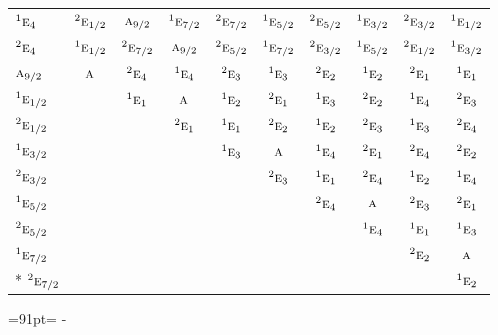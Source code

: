 \documentclass[10pt,a4paper]{article}
\newcommand{\needspace}[1]{\par\penalty-100\begingroup\dimen0=#1\relax\dimen2=\pagegoal
  \advance\dimen2-\pagetotal\ifdim\dimen0>\dimen2\relax\ifdim\dimen2>0pt\vfil\break\fi\fi
  \endgroup}
\numberwithin{equation}{section}
\newcommand{\irr}[1]{\text{\normalfont\scshape #1}}
\newcommand{\conjpair}[1]{{}^{#1}}
\begin{document}
{\begin{longtable}{@{}lccccccccc@{}}
$\conjpair{1}\irr{e}_{4}$ & $\conjpair{2}\irr{e}_{1/2}$ & $\irr{a}_{9/2}$ & $\conjpair{1}\irr{e}_{7/2}$ & $\conjpair{2}\irr{e}_{7/2}$ & $\conjpair{1}\irr{e}_{5/2}$ & $\conjpair{2}\irr{e}_{5/2}$ & $\conjpair{1}\irr{e}_{3/2}$ & $\conjpair{2}\irr{e}_{3/2}$ & $\conjpair{1}\irr{e}_{1/2}$\\
$\conjpair{2}\irr{e}_{4}$ & $\conjpair{1}\irr{e}_{1/2}$ & $\conjpair{2}\irr{e}_{7/2}$ & $\irr{a}_{9/2}$ & $\conjpair{2}\irr{e}_{5/2}$ & $\conjpair{1}\irr{e}_{7/2}$ & $\conjpair{2}\irr{e}_{3/2}$ & $\conjpair{1}\irr{e}_{5/2}$ & $\conjpair{2}\irr{e}_{1/2}$ & $\conjpair{1}\irr{e}_{3/2}$\\
$\irr{a}_{9/2}$ & $\irr{a}$ & $\conjpair{2}\irr{e}_{4}$ & $\conjpair{1}\irr{e}_{4}$ & $\conjpair{2}\irr{e}_{3}$ & $\conjpair{1}\irr{e}_{3}$ & $\conjpair{2}\irr{e}_{2}$ & $\conjpair{1}\irr{e}_{2}$ & $\conjpair{2}\irr{e}_{1}$ & $\conjpair{1}\irr{e}_{1}$\\
$\conjpair{1}\irr{e}_{1/2}$ &  & $\conjpair{1}\irr{e}_{1}$ & $\irr{a}$ & $\conjpair{1}\irr{e}_{2}$ & $\conjpair{2}\irr{e}_{1}$ & $\conjpair{1}\irr{e}_{3}$ & $\conjpair{2}\irr{e}_{2}$ & $\conjpair{1}\irr{e}_{4}$ & $\conjpair{2}\irr{e}_{3}$\\
$\conjpair{2}\irr{e}_{1/2}$ &  &  & $\conjpair{2}\irr{e}_{1}$ & $\conjpair{1}\irr{e}_{1}$ & $\conjpair{2}\irr{e}_{2}$ & $\conjpair{1}\irr{e}_{2}$ & $\conjpair{2}\irr{e}_{3}$ & $\conjpair{1}\irr{e}_{3}$ & $\conjpair{2}\irr{e}_{4}$\\
$\conjpair{1}\irr{e}_{3/2}$ &  &  &  & $\conjpair{1}\irr{e}_{3}$ & $\irr{a}$ & $\conjpair{1}\irr{e}_{4}$ & $\conjpair{2}\irr{e}_{1}$ & $\conjpair{2}\irr{e}_{4}$ & $\conjpair{2}\irr{e}_{2}$\\
$\conjpair{2}\irr{e}_{3/2}$ &  &  &  &  & $\conjpair{2}\irr{e}_{3}$ & $\conjpair{1}\irr{e}_{1}$ & $\conjpair{2}\irr{e}_{4}$ & $\conjpair{1}\irr{e}_{2}$ & $\conjpair{1}\irr{e}_{4}$\\
$\conjpair{1}\irr{e}_{5/2}$ &  &  &  &  &  & $\conjpair{2}\irr{e}_{4}$ & $\irr{a}$ & $\conjpair{2}\irr{e}_{3}$ & $\conjpair{2}\irr{e}_{1}$\\
$\conjpair{2}\irr{e}_{5/2}$ &  &  &  &  &  &  & $\conjpair{1}\irr{e}_{4}$ & $\conjpair{1}\irr{e}_{1}$ & $\conjpair{1}\irr{e}_{3}$\\
$\conjpair{1}\irr{e}_{7/2}$ &  &  &  &  &  &  &  & $\conjpair{2}\irr{e}_{2}$ & $\irr{a}$\\*
$\conjpair{2}\irr{e}_{7/2}$ &  &  &  &  &  &  &  &  & $\conjpair{1}\irr{e}_{2}$\\
\bottomrule\end{longtable}}
\needspace{91pt}
\end{document}

